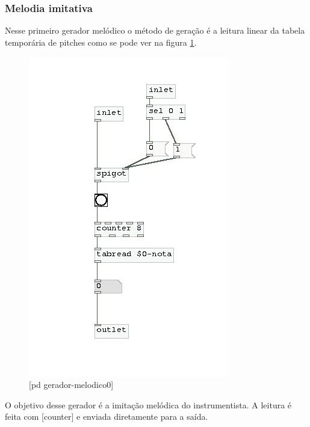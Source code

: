 \documentclass{ppgmus}
\begin{document}
\subsubsection{Melodia imitativa}

Nesse primeiro gerador melódico o método de geração
é a leitura linear da tabela temporária de pitches
como se pode ver na figura \ref{gera-melodico0}.


\begin{figure}
\includegraphics[scale=.6]{gera-melodico0}
\caption{[pd gerador-melodico0]}
\label{gera-melodico0}
\end{figure}  




O objetivo desse gerador é a imitação melódica
do instrumentista. A leitura é feita com [counter]
e enviada diretamente para a saída.
\end{document}

